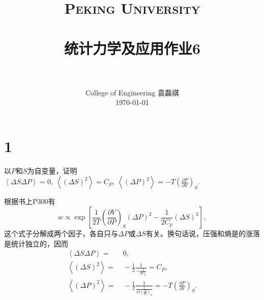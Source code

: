 \documentclass[12pt]{article}
\title{
		\vspace{-1in} 	
		\usefont{OT1}{bch}{b}{n}
		\normalfont \normalsize \textsc{\LARGE Peking University}\\[0.2cm] %
		\horrule{0.5pt} \\[0.2cm]
		\huge \bfseries{统计力学及应用作业6} \\[-0.2cm]
		\horrule{2pt} \\[0.2cm]
}
\author{
		\normalfont 								\normalsize
		College of Engineering \quad 2001111690  \quad 袁磊祺\\	\normalsize
        \today
}
\date{}
\begin{document}


\maketitle

\section{1}


以$P$和$S$为自变量，证明$\left\langle \Delta S\Delta P\right\rangle =0,\ \left\langle \left(\Delta S\right) ^2\right\rangle = C_P,\ \left\langle \left(\Delta P\right) ^2\right\rangle = -T \left(\frac{\partial P}{\partial V} \right)_S$.

根据书上P300有
\begin{equation}
	w \propto \exp \left[\frac{1}{2T}\left(\frac{\partial V}{\partial P}\right)_S\left(\Delta P\right)^2 - \frac{1}{2C_p} \left( \Delta S \right) ^2\right],
\end{equation}
这个式子分解成两个因子，各自只与$\Delta P$或$\Delta S$有关。换句话说，压强和熵是的涨落是统计独立的，因而
\begin{align}
	\left\langle \Delta S\Delta P\right\rangle =         & \ 0,                                                                                                                                    \\
	\left\langle \left(\Delta S\right) ^2\right\rangle = & \ -\frac{1}{2} \frac{1}{-\frac{1}{2C_p}} =  C_P,                                                                                        \\
	\left\langle \left(\Delta P\right) ^2\right\rangle = & \ -\frac{1}{2} \frac{1}{\frac{1}{2T \left(\frac{\partial P}{\partial V} \right)_S}} = -T \left(\frac{\partial P}{\partial V} \right)_S.
\end{align}










% 
\end{document}

